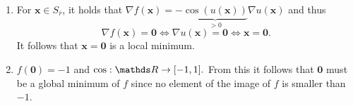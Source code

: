 \documentclass[a4paper]{article}
\begin{document}
{\begin{enumerate}
  $\nabla^2 u(\mathbf{x}) = \begin{pmatrix} 2 & 1 \\ 1 & 2\end{pmatrix}$ \\
  For $\mathbf{x} \in S_{\bar{r}}$, it holds that $u(\mathbf{x}) \geq 0$, since $$0 \leq \frac{1}{2} (x_1 + x_2)^2 = \frac{1}{2}x_1^2 + \frac{1}{2}x_2^2 + x_1x_2 \leq x_1^2 + x_2^2 + x_1x_2 = u(\mathbf{x}),$$ and that $u(\mathbf{x}) < \pi/4$.
  This implies that $\cos(u(\mathbf{x})) > 0$ and $\sin(u(\mathbf{x})) \geq 0$. \\
  $\nabla u(\mathbf{x}) \nabla u(\mathbf{x})^\top$ is positive semi-definite since $$\mathbf{v}^\top \nabla u(\mathbf{x}) \nabla u(\mathbf{x})^\top \mathbf{v} = (\mathbf{v}^\top\nabla u(\mathbf{x}))^2 \geq 0.$$
  $\nabla^2 u(\mathbf{x})$ is positive definite since $$\mathbf{v}^\top \nabla^2 u(\mathbf{x}) \mathbf{v} = 2 v_1^2 + 2v_1v_2 + 2 v_2^2 = v_1^2 + v_2^2 + (v_1 + v_2)^2 \geq 0$$
  and equality only holds if $\mathbf{v} = \mathbf{0}$. \\
  So, in total, for $\mathbf{x} \in S_{\bar{r}}$, we have that
  \begin{equation*}
    \nabla^2 f(\mathbf{x}) = \underbrace{\cos(u(\mathbf{x}))}_{> 0} \underbrace{\nabla u(\mathbf{x}) \nabla u(\mathbf{x})^\top}_{\text{p.s.d.}} + \underbrace{\sin(u(\mathbf{x}))}_{\geq 0} \underbrace{\nabla^2 u(\mathbf{x})}_{\text{p.d.}}.
  \end{equation*}
  $\Rightarrow \nabla^2 f(\mathbf{x})$ is positive semi-definite. \\
  $\Rightarrow f_{|S_{\overline{r}}}$ is convex.
\item For $\mathbf{x} \in S_{\bar{r}}$, it holds that $\nabla f(\mathbf{x}) = -\underbrace{\cos(u(\mathbf{x}))}_{> 0} \nabla u(\mathbf{x})$ and thus $$\nabla f(\mathbf{x}) = \mathbf{0} \iff \nabla u(\mathbf{x}) = \mathbf{0} \iff \mathbf{x} = \mathbf{0}.$$
  It follows that $\mathbf{x} = \mathbf{0}$ is a local minimum.
\item $f(\mathbf{0}) = -1$ and $\cos: \R \rightarrow [-1, 1].$ From this it follows that $\mathbf{0}$ must be a global minimum of $f$ since no element of the image of $f$ is smaller than $-1$.
\end{enumerate}
}
\end{document}
